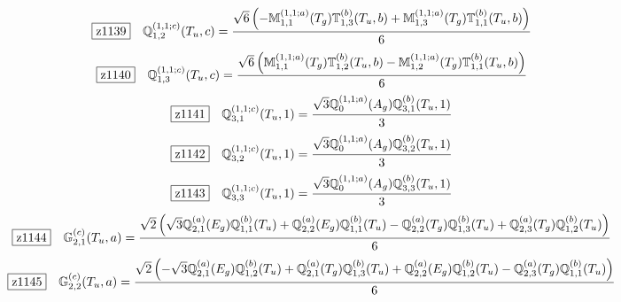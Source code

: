 \documentclass[fleqn,10pt,landscape]{jsarticle}
\begin{document}
\begin{dmath*}
\hspace*{3mm}\fbox{z1139}\quad \mathbb{Q}_{1,2}^{(1,1;c)}(T_{u},c)=\frac{\sqrt{6} \left(- \mathbb{M}_{1,1}^{(1,1;a)}(T_{g}) \mathbb{T}_{1,3}^{(b)}(T_{u},b) + \mathbb{M}_{1,3}^{(1,1;a)}(T_{g}) \mathbb{T}_{1,1}^{(b)}(T_{u},b)\right)}{6}
\end{dmath*}
\begin{dmath*}
\hspace*{3mm}\fbox{z1140}\quad \mathbb{Q}_{1,3}^{(1,1;c)}(T_{u},c)=\frac{\sqrt{6} \left(\mathbb{M}_{1,1}^{(1,1;a)}(T_{g}) \mathbb{T}_{1,2}^{(b)}(T_{u},b) - \mathbb{M}_{1,2}^{(1,1;a)}(T_{g}) \mathbb{T}_{1,1}^{(b)}(T_{u},b)\right)}{6}
\end{dmath*}
\begin{dmath*}
\hspace*{3mm}\fbox{z1141}\quad \mathbb{Q}_{3,1}^{(1,1;c)}(T_{u},1)=\frac{\sqrt{3} \mathbb{Q}_{0}^{(1,1;a)}(A_{g}) \mathbb{Q}_{3,1}^{(b)}(T_{u},1)}{3}
\end{dmath*}
\begin{dmath*}
\hspace*{3mm}\fbox{z1142}\quad \mathbb{Q}_{3,2}^{(1,1;c)}(T_{u},1)=\frac{\sqrt{3} \mathbb{Q}_{0}^{(1,1;a)}(A_{g}) \mathbb{Q}_{3,2}^{(b)}(T_{u},1)}{3}
\end{dmath*}
\begin{dmath*}
\hspace*{3mm}\fbox{z1143}\quad \mathbb{Q}_{3,3}^{(1,1;c)}(T_{u},1)=\frac{\sqrt{3} \mathbb{Q}_{0}^{(1,1;a)}(A_{g}) \mathbb{Q}_{3,3}^{(b)}(T_{u},1)}{3}
\end{dmath*}
\begin{dmath*}
\hspace*{3mm}\fbox{z1144}\quad \mathbb{G}_{2,1}^{(c)}(T_{u},a)=\frac{\sqrt{2} \left(\sqrt{3} \mathbb{Q}_{2,1}^{(a)}(E_{g}) \mathbb{Q}_{1,1}^{(b)}(T_{u}) + \mathbb{Q}_{2,2}^{(a)}(E_{g}) \mathbb{Q}_{1,1}^{(b)}(T_{u}) - \mathbb{Q}_{2,2}^{(a)}(T_{g}) \mathbb{Q}_{1,3}^{(b)}(T_{u}) + \mathbb{Q}_{2,3}^{(a)}(T_{g}) \mathbb{Q}_{1,2}^{(b)}(T_{u})\right)}{6}
\end{dmath*}
\begin{dmath*}
\hspace*{3mm}\fbox{z1145}\quad \mathbb{G}_{2,2}^{(c)}(T_{u},a)=\frac{\sqrt{2} \left(- \sqrt{3} \mathbb{Q}_{2,1}^{(a)}(E_{g}) \mathbb{Q}_{1,2}^{(b)}(T_{u}) + \mathbb{Q}_{2,1}^{(a)}(T_{g}) \mathbb{Q}_{1,3}^{(b)}(T_{u}) + \mathbb{Q}_{2,2}^{(a)}(E_{g}) \mathbb{Q}_{1,2}^{(b)}(T_{u}) - \mathbb{Q}_{2,3}^{(a)}(T_{g}) \mathbb{Q}_{1,1}^{(b)}(T_{u})\right)}{6}
\end{dmath*}
\end{document}
